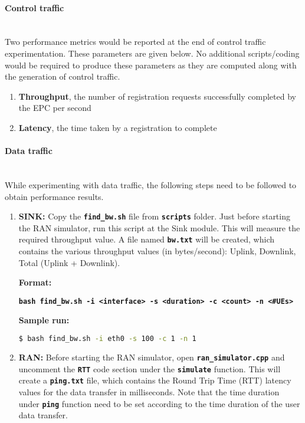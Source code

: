 \documentclass[hidelinks]{report}
\newcommand{\cf}[1] {
	\textbf{\texttt{#1}}
}
\begin{document}
\paragraph*{Control traffic}

~\\ Two performance metrics would be reported at the end of control traffic experimentation. These parameters are given below. No additional scripts/coding would be required to produce these parameters as they are computed along with the generation of control traffic. 

\begin{enumerate}

\item \textbf{Throughput}, the number of registration requests successfully completed by the EPC per second

\item \textbf{Latency}, the time taken by a registration to complete

\end{enumerate}

\paragraph*{Data traffic}

~\\ While experimenting with data traffic, the following steps need to be followed to obtain performance results.

\begin{enumerate}

\item \textbf{SINK:} Copy the \cf{find\_bw.sh} file from \cf{scripts} folder. Just before starting the RAN simulator, run this script at the Sink module. This will measure the required throughput value. A file named \cf{bw.txt} will be created, which contains the various throughput values (in bytes/second): Uplink, Downlink, Total (Uplink + Downlink). 

\textbf{Format:}
\begin{center}

\cf{bash find\_bw.sh -i <interface> -s <duration> -c <count> -n <\#UEs>} 

\end{center}

\textbf{Sample run:}

\begin{lstlisting}[language=bash]
$ bash find_bw.sh -i eth0 -s 100 -c 1 -n 1
\end{lstlisting}

\item \textbf{RAN:} Before starting the RAN simulator, open \cf{ran\_simulator.cpp} and uncomment the \cf{RTT} code section under the \cf{simulate} function. This will create a \cf{ping.txt} file, which contains the Round Trip Time (RTT) latency values for the data transfer in milliseconds. Note that the time duration under \cf{ping} function need to be set according to the time duration of the user data transfer.

\end{enumerate}
\end{document}
